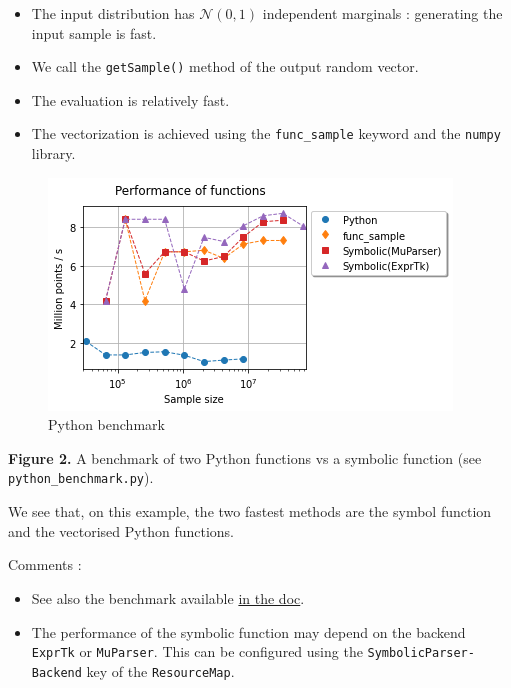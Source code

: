 \documentclass[11pt]{article}
\providecommand{\tightlist}{%
      \setlength{\itemsep}{0pt}\setlength{\parskip}{0pt}}
\begin{document}
\begin{itemize}
\tightlist
\item
  The input distribution has \(\mathcal{N}(0,1)\) independent marginals
  : generating the input sample is fast.
\item
  We call the \texttt{getSample()} method of the output random vector.
\item
  The evaluation is relatively fast.
\item
  The vectorization is achieved using the \texttt{func\_sample} keyword
  and the \texttt{numpy} library.
\end{itemize}

    \begin{figure}
\centering
\includegraphics{wrapper-python-benchmark.png}
\caption{Python benchmark}
\end{figure}

\textbf{Figure 2.} A benchmark of two Python functions vs a symbolic
function (see \texttt{python\_benchmark.py}).

We see that, on this example, the two fastest methods are the symbol
function and the vectorised Python functions.

    Comments :

\begin{itemize}
\item
  See also the benchmark available
  \href{https://openturns.github.io/openturns/latest/developer_guide/wrapper_development.html\#performance-considerations}{in
  the doc}.
\item
  The performance of the symbolic function may depend on the backend
  \texttt{ExprTk} or \texttt{MuParser}. This can be configured using the
  \texttt{SymbolicParser-Backend} key of the \texttt{ResourceMap}.
\end{itemize}
\end{document}
